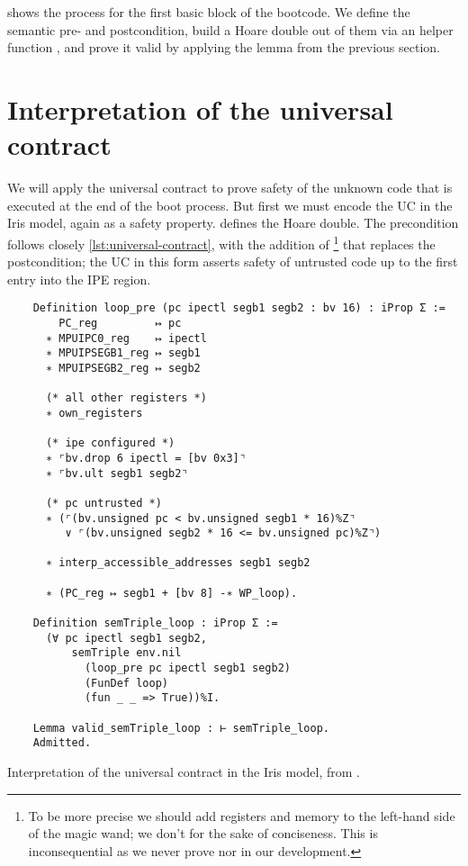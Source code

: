  shows the process for the first basic block of the bootcode. We define the semantic pre- and postcondition, build a Hoare double out of them via an helper function , and prove it valid by applying the  lemma from the previous section.

\section{Interpretation of the universal contract}

We will apply the universal contract to prove safety of the unknown code that is executed at the end of the boot process. But first we must encode the UC in the Iris model, again as a safety property.  defines the Hoare double. The precondition follows closely \cref{lst:universal-contract}, with the addition of \footnote{To be more precise we should add registers and memory to the left-hand side of the magic wand; we don't for the sake of conciseness. This is inconsequential as we never prove  nor  in our development.} that replaces the postcondition; the UC in this form asserts safety of untrusted code up to the first entry into the IPE region.

\begin{listing}
  \begin{verbatim}
    Definition loop_pre (pc ipectl segb1 segb2 : bv 16) : iProp Σ :=
        PC_reg         ↦ pc
      ∗ MPUIPC0_reg    ↦ ipectl
      ∗ MPUIPSEGB1_reg ↦ segb1
      ∗ MPUIPSEGB2_reg ↦ segb2

      (* all other registers *)
      ∗ own_registers

      (* ipe configured *)
      ∗ ⌜bv.drop 6 ipectl = [bv 0x3]⌝
      ∗ ⌜bv.ult segb1 segb2⌝

      (* pc untrusted *)
      ∗ (⌜(bv.unsigned pc < bv.unsigned segb1 * 16)%Z⌝
         ∨ ⌜(bv.unsigned segb2 * 16 <= bv.unsigned pc)%Z⌝)

      ∗ interp_accessible_addresses segb1 segb2

      ∗ (PC_reg ↦ segb1 + [bv 8] -∗ WP_loop).

    Definition semTriple_loop : iProp Σ :=
      (∀ pc ipectl segb1 segb2,
          semTriple env.nil
            (loop_pre pc ipectl segb1 segb2)
            (FunDef loop)
            (fun _ _ => True))%I.

    Lemma valid_semTriple_loop : ⊢ semTriple_loop.
    Admitted.
  \end{verbatim}
  \caption{Interpretation of the universal contract in the Iris model, from .}
  \label{lst:loop-verification}
\end{listing}

